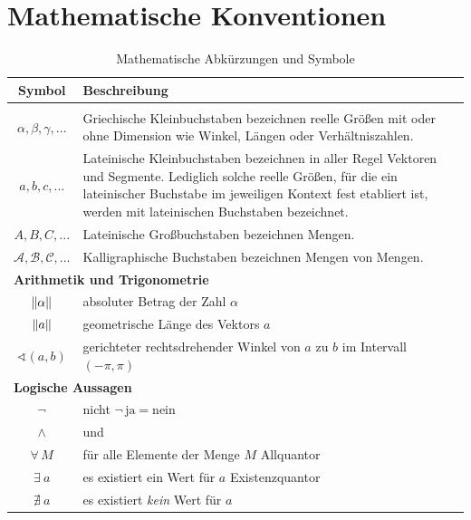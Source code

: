 \documentclass[../main/thesis.tex]{subfiles}
\begin{document}
\chapter{Mathematische Konventionen}
\label{appx:mathsymbols}

{\setlength{\doublerulesep}{1mm}%
\begin{longtable}[c]{|c|p{12cm}|}
\hline
\textbf{Symbol} & \textbf{Beschreibung} \\
\hline
\hline
\endhead
\caption*{(fortgesetzt)}
\endfoot
\caption{Mathematische Abkürzungen und Symbole}
\endlastfoot
\multicolumn{2}{|l|}{\textbf{Bezeichner}} \\
\hline
$\alpha,\beta,\gamma,...$ & Griechische Kleinbuchstaben bezeichnen reelle Größen mit oder ohne Dimension wie Winkel, Längen oder Verhältniszahlen. \\
\hline
$a,b,c,...$ & Lateinische Kleinbuchstaben bezeichnen in aller Regel Vektoren und Segmente. Lediglich solche reelle Größen, für die ein lateinischer Buchstabe im jeweiligen Kontext fest etabliert ist, werden mit lateinischen Buchstaben bezeichnet. \\
\hline
$A,B,C,...$ & Lateinische Großbuchstaben bezeichnen Mengen. \\
\hline
$\mathcal{A},\mathcal{B},\mathcal{C},...$ & Kalligraphische Buchstaben bezeichnen Mengen von Mengen. \\
\hline
\hline
\multicolumn{2}{|l|}{\textbf{Arithmetik und Trigonometrie}} \\
\hline
$\abs[\alpha]$ & absoluter Betrag der Zahl $\alpha$ \\  %
\hline
$\abs[a]$ & geometrische Länge des Vektors $a$ \\  %
\hline
$\sphericalangle(a,b)$ & gerichteter rechtsdrehender Winkel von $a$ zu $b$ im Intervall $(-\pi,\pi)$ \\
\hline
\hline
\multicolumn{2}{|l|}{\textbf{Logische Aussagen}} \\
\hline
$\neg$ & nicht \hfill $\neg\,\text{ja} = \text{nein}$ \\
\hline
$\wedge$ & und \\
\hline
$\forall\, M$ & für alle Elemente der Menge $M$ \hfill Allquantor \\
\hline
$\exists\ a$ & es existiert ein Wert für $a$ \hfill Existenzquantor \\
\hline
$\nexists\ a$ & es existiert \emph{kein} Wert für $a$ \\
\hline

\end{longtable}}
\end{document}
